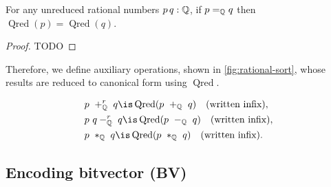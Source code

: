 \begin{lemma}
For any unreduced rational numbers $p\,q: \mathbb{Q}$, if $p =_{\mathbb{Q}} q$ then $\operatorname{Qred}(p) = \operatorname{Qred}(q)$. 
\begin{proof}
TODO
\end{proof}
\end{lemma}

Therefore, we define auxiliary operations, shown in \cref{fig:rational-sort}, whose results are reduced to canonical form using $\operatorname{Qred}$.

\begin{align*}
& p~+^r_\Q~q \is \operatorname{Qred}(p~+_\Q~q) \quad \text{(written infix)}, \\
& p~q-^r_\Q~q \is \operatorname{Qred}(p~-_\Q~q) \quad \text{(written infix)}, \\
& p~*_\Q~q \is \operatorname{Qred}(p~*_\Q~q) \quad \text{(written infix)}.
\end{align*}


\subsection{Encoding bitvector (\textbf{BV})}
\label{ssec:encoding-bv}

